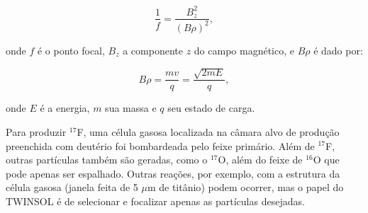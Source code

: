 \documentclass[a4paper,12pt,oneside]{book}
\begin{document}
\begin{equation}
    \frac{1}{f} = \frac{B_z ^2}{(B\rho)^2},
\end{equation}

onde $f$ é o ponto focal, $B_z$ a componente $z$ do campo magnético, e $B\rho$ é dado por:

\begin{equation}
    B\rho = \frac{mv}{q} = \frac{\sqrt{2mE}}{q},
\end{equation}

onde $E$ é a energia, $m$ sua massa e $q$ seu estado de carga.



\par Para produzir $^{17}$F, uma célula gasosa localizada na câmara alvo de produção\cite{twinsol} preenchida com deutério foi bombardeada pelo feixe primário. Além de $^{17}$F, outras partículas também são geradas, como o $^{17}$O, além do feixe de $^{16}$O que pode apenas ser espalhado. Outras reações, por exemplo, com a estrutura da célula gasosa (janela feita de 5 $\mu$m de titânio\cite{twinsol}) podem ocorrer, mas o papel do TWINSOL é de selecionar e focalizar apenas as partículas desejadas.
\end{document}
